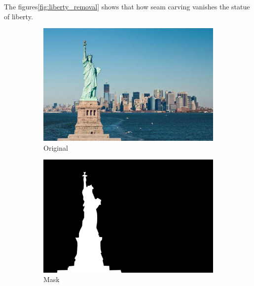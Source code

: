 \documentclass[final]{cvpr}
\begin{document}
The figures\ref{fig:liberty_removal} shows that how seam carving vanishes the statue of liberty.
\begin{figure}[htb]
\begin{center}
\begin{subfigure}[b]{0.40\linewidth}
    \includegraphics[width=\textwidth]{liberty.jpg}
    \caption{Original}
\end{subfigure}
\begin{subfigure}[b]{0.40\linewidth}
    \includegraphics[width=\textwidth]{liberty_mask.jpg}
    \caption{Mask}
\end{subfigure}
\begin{subfigure}[b]{0.70\linewidth}

\end{subfigure}
\end{center}
\end{figure}
\end{document}
